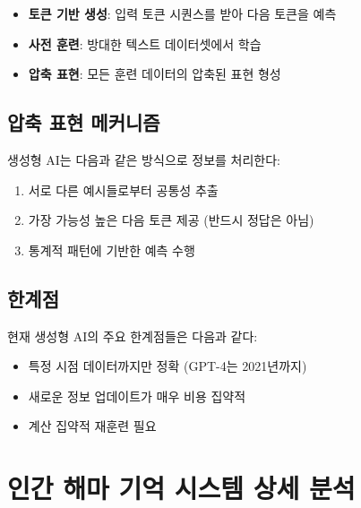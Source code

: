 \documentclass[openany]{book}
\begin{document}
\begin{appendices}
\begin{itemize}
\item \textbf{토큰 기반 생성}: 입력 토큰 시퀀스를 받아 다음 토큰을 예측
\item \textbf{사전 훈련}: 방대한 텍스트 데이터셋에서 학습
\item \textbf{압축 표현}: 모든 훈련 데이터의 압축된 표현 형성
\end{itemize}

\subsection{압축 표현 메커니즘}
생성형 AI는 다음과 같은 방식으로 정보를 처리한다:

\begin{enumerate}
\item 서로 다른 예시들로부터 공통성 추출
\item 가장 가능성 높은 다음 토큰 제공 (반드시 정답은 아님)
\item 통계적 패턴에 기반한 예측 수행
\end{enumerate}

\subsection{한계점}
현재 생성형 AI의 주요 한계점들은 다음과 같다:

\begin{itemize}
\item 특정 시점 데이터까지만 정확 (GPT-4는 2021년까지)
\item 새로운 정보 업데이트가 매우 비용 집약적
\item 계산 집약적 재훈련 필요
\end{itemize}

\section{인간 해마 기억 시스템 상세 분석}


\end{appendices}
\end{document}
